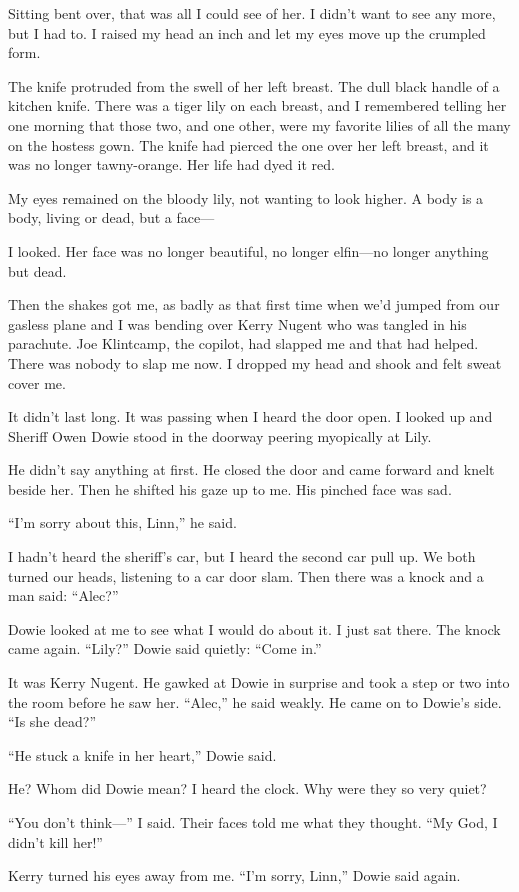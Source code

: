 \documentclass{novel}
\begin{document}
{Sitting bent over, that was all I could see of her. I didn’t want to see any more, but I had to. I raised my head an inch and let my eyes move up the crumpled form.

The knife protruded from the swell of her left breast. The dull black handle of a kitchen knife. There was a tiger lily on each breast, and I remembered telling her one morning that those two, and one other, were my favorite lilies of all the many on the hostess gown. The knife had pierced the one over her left breast, and it was no longer tawny-orange. Her life had dyed it red.

My eyes remained on the bloody lily, not wanting to look higher. A body is a body, living or dead, but a face—

I looked. Her face was no longer beautiful, no longer elfin—no longer anything but dead.

Then the shakes got me, as badly as that first time when we’d jumped from our gasless plane and I was bending over Kerry Nugent who was tangled in his parachute. Joe Klintcamp, the copilot, had slapped me and that had helped. There was nobody to slap me now. I dropped my head and shook and felt sweat cover me.

It didn’t last long. It was passing when I heard the door open. I looked up and Sheriff Owen Dowie stood in the doorway peering myopically at Lily.

He didn’t say anything at first. He closed the door and came forward and knelt beside her. Then he shifted his gaze up to me. His pinched face was sad.

“I’m sorry about this, Linn,” he said.

I hadn’t heard the sheriff’s car, but I heard the second car pull up. We both turned our heads, listening to a car door slam. Then there was a knock and a man said: “Alec?”

Dowie looked at me to see what I would do about it. I just sat there. The knock came again. “Lily?” Dowie said quietly: “Come in.”

It was Kerry Nugent. He gawked at Dowie in surprise and took a step or two into the room before he saw her. “Alec,” he said weakly. He came on to Dowie’s side. “Is she dead?”

“He stuck a knife in her heart,” Dowie said.

He? Whom did Dowie mean? I heard the clock. Why were they so very quiet?

“You don’t think—” I said. Their faces told me what they thought. “My God, I didn’t kill her!”

Kerry turned his eyes away from me. “I’m sorry, Linn,” Dowie said again.

}
\end{document}
